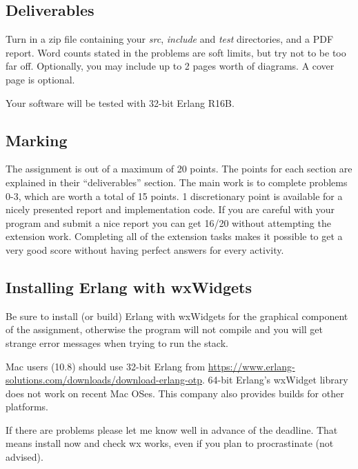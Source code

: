 \documentclass[a4paper]{article}
\begin{document}
\subsection*{Deliverables} %
\label{sub:deliverables}

Turn in a zip file containing your \emph{src}, \emph{include} and \emph{test}
directories, and a PDF report. Word counts stated in the problems are soft
limits, but try not to be too far off. Optionally, you may include up to 2
pages worth of diagrams. A cover page is optional.

Your software will be tested with 32-bit Erlang R16B.


\subsection*{Marking} %
\label{sub:marking}

The assignment is out of a maximum of 20 points. The points for each section
are explained in their ``deliverables'' section. The main work is to complete
problems 0-3, which are worth a total of 15 points. 1 discretionary point is
available for a nicely presented report and implementation code. If you
are careful with your program and submit a nice report you can get 16/20
without attempting the extension work. Completing all of the extension tasks
makes it possible to get a very good score without having perfect answers for
every activity.



\subsection*{Installing Erlang with wxWidgets} %
\label{sub:installing_erlang_and_wx}

Be sure to install (or build) Erlang with wxWidgets for the graphical
component of the assignment, otherwise the program will not compile and you
will get strange error messages when trying to run the stack.

Mac users (10.8) should use 32-bit Erlang from
\url{https://www.erlang-solutions.com/downloads/download-erlang-otp}. 64-bit
Erlang's wxWidget library does not work on recent Mac OSes. This
company also provides builds for other platforms.

If there are problems please let me know well in advance of the deadline.
That means install now and check wx works, even if you plan to procrastinate
(not advised).
\end{document}
